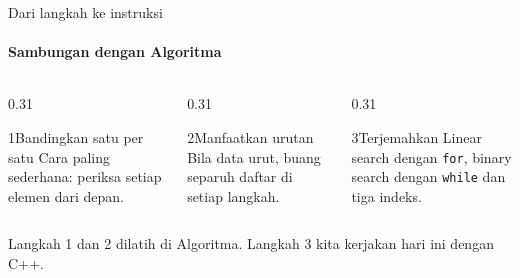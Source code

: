 \documentclass[t]{beamer}
\begin{document}
\begin{frame}{Dari langkah ke instruksi}
\framesubtitle{Sambungan dengan Algoritma}
\begin{columns}[T]
\begin{column}{0.31\textwidth}
\begin{Langkah}{1}{Bandingkan satu per satu}
Cara paling sederhana: periksa setiap elemen dari depan.
\end{Langkah}
\end{column}
\begin{column}{0.31\textwidth}
\begin{Langkah}{2}{Manfaatkan urutan}
Bila data urut, buang separuh daftar di setiap langkah.
\end{Langkah}
\end{column}
\begin{column}{0.31\textwidth}
\begin{Langkah}{3}{Terjemahkan}
Linear search dengan \texttt{for}, binary search dengan \texttt{while} dan tiga indeks.
\end{Langkah}
\end{column}
\end{columns}
\vspace{10pt}
Langkah 1 dan 2 dilatih di Algoritma. Langkah 3 kita kerjakan hari ini dengan C++.
\end{frame}

\end{document}

